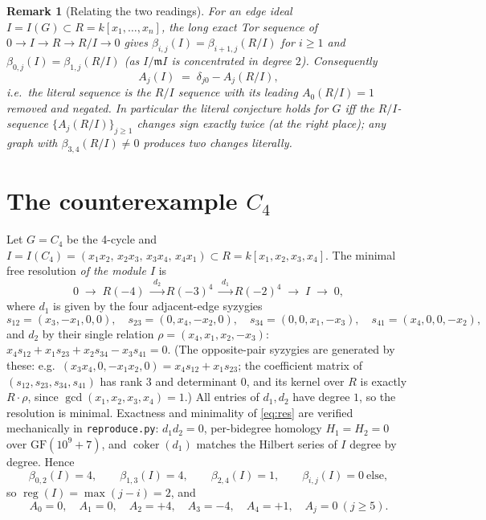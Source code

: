 \documentclass[11pt]{article}
\newtheorem{remark}[theorem]{Remark}
\begin{document}
\begin{remark}[Relating the two readings]
\label{rem:les}
For an edge ideal $I=I(G)\subset R=k[x_1,\dots,x_n]$, the long exact Tor
sequence of $0\to I\to R\to R/I\to 0$ gives
$\beta_{i,j}(I)=\beta_{i+1,j}(R/I)$ for $i\ge 1$ and
$\beta_{0,j}(I)=\beta_{1,j}(R/I)$ (as $I/\mathfrak m I$ is concentrated in
degree $2$).  Consequently
\begin{equation}
\label{eq:ident}
A_j(I)\;=\;\delta_{j0}-A_j(R/I),
\end{equation}
i.e.\ the literal sequence is the $R/I$ sequence with its leading
$A_0(R/I)=1$ removed and negated.  In particular the literal conjecture
holds for $G$ iff the $R/I$-sequence $\{A_j(R/I)\}_{j\ge1}$ changes sign
exactly twice (at the right place); any graph with
$\beta_{3,4}(R/I)\neq 0$ produces \emph{two} changes literally.
\end{remark}

\section{The counterexample $C_4$}

Let $G=C_4$ be the 4-cycle and $I=I(C_4)=(x_1x_2,\,x_2x_3,\,x_3x_4,\,
x_4x_1)\subset R=k[x_1,x_2,x_3,x_4]$.  The minimal free resolution
\emph{of the module $I$} is
\begin{equation}
\label{eq:res}
0\;\longrightarrow\;R(-4)\;\xrightarrow{\;d_2\;}
R(-3)^4\;\xrightarrow{\;d_1\;}R(-2)^4\;\longrightarrow\;I\;\longrightarrow\;0,
\end{equation}
where $d_1$ is given by the four adjacent-edge syzygies
\[
s_{12}=(x_3,-x_1,0,0),\quad
s_{23}=(0,x_4,-x_2,0),\quad
s_{34}=(0,0,x_1,-x_3),\quad
s_{41}=(x_4,0,0,-x_2),
\]
and $d_2$ by their single relation $\rho=(x_4,x_1,x_2,-x_3)$:
$x_4s_{12}+x_1s_{23}+x_2s_{34}-x_3s_{41}=0$.  (The opposite-pair syzygies
are generated by these: e.g.\ $(x_3x_4,0,-x_1x_2,0)=x_4s_{12}+x_1s_{23}$;
the coefficient matrix of $(s_{12},s_{23},s_{34},s_{41})$ has rank $3$ and
determinant $0$, and its kernel over $R$ is exactly $R\cdot\rho$, since
$\gcd(x_1,x_2,x_3,x_4)=1$.)  All entries of $d_1,d_2$ have degree $1$, so
the resolution is minimal.  Exactness and minimality of \eqref{eq:res} are
verified mechanically in \texttt{reproduce.py}: $d_1d_2=0$, per-bidegree
homology $H_1=H_2=0$ over $\mathrm{GF}(10^9{+}7)$, and
$\operatorname{coker}(d_1)$ matches the Hilbert series of $I$ degree by
degree.  Hence
\[
\beta_{0,2}(I)=4,\qquad \beta_{1,3}(I)=4,\qquad \beta_{2,4}(I)=1,
\qquad \beta_{i,j}(I)=0\ \text{else},
\]
so $\operatorname{reg}(I)=\max(j-i)=2$, and
\[
A_0=0,\quad A_1=0,\quad A_2=+4,\quad A_3=-4,\quad A_4=+1,\quad A_j=0\ (j\ge5).
\]
\end{document}
